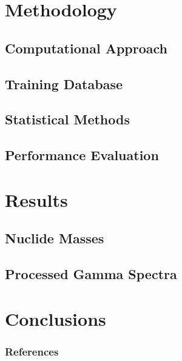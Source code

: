 \documentclass[10pt]{beamer}
\begin{document}
\section{Methodology}
\subsection{Computational Approach}

\subsection{Training Database}

\subsection{Statistical Methods}

\subsection{Performance Evaluation}


\section{Results}
\subsection{Nuclide Masses}

\subsection{Processed Gamma Spectra}


\section{Conclusions}




\begin{frame}[allowframebreaks]
  \frametitle{References}
  
  {\footnotesize  }
\end{frame}

\end{document}
